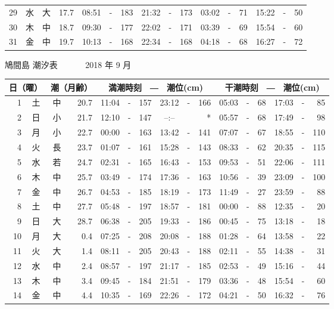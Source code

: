 \documentclass[12pt.a4j]{jsarticle}
\begin{document}
\begin{center}
\begin{table}[ht]
\begin{tabular}{|rc|cr|ccrccr|ccrccr|}
29 & 水 & 大 & 17.7 & 08:51 &-& 183 & 21:32 &-& 173 & 03:02 &-&  71 & 15:22 &-&  50 \\
30 & 木 & 中 & 18.7 & 09:30 &-& 177 & 22:02 &-& 171 & 03:39 &-&  69 & 15:54 &-&  60 \\
31 & 金 & 中 & 19.7 & 10:13 &-& 168 & 22:34 &-& 168 & 04:18 &-&  68 & 16:27 &-&  72 \\
\hline
\end{tabular}
\end{table}
\newpage
{\LARGE 鳩間島  潮汐表　　　}
{\large 2018 年  9 月}\\
\begin{table}[ht]
\begin{tabular}{|rc|cr|ccrccr|ccrccr|}
\hline
\multicolumn{2}{|c|}{日（曜）} & \multicolumn{2}{c|}{潮（月齢）} & \multicolumn{6}{c|}{満潮時刻　―　潮位(cm)} & \multicolumn{6}{c|}{干潮時刻　―　潮位(cm)} \\
\hline
 1 & 土 & 中 & 20.7 & 11:04 &-& 157 & 23:12 &-& 166 & 05:03 &-&  68 & 17:03 &-&  85 \\
 2 & 日 & 小 & 21.7 & 12:10 &-& 147 & --:-- & &  *  & 05:57 &-&  68 & 17:49 &-&  98 \\
 3 & 月 & 小 & 22.7 & 00:00 &-& 163 & 13:42 &-& 141 & 07:07 &-&  67 & 18:55 &-& 110 \\
 4 & 火 & 長 & 23.7 & 01:07 &-& 161 & 15:28 &-& 143 & 08:33 &-&  62 & 20:35 &-& 115 \\
 5 & 水 & 若 & 24.7 & 02:31 &-& 165 & 16:43 &-& 153 & 09:53 &-&  51 & 22:06 &-& 111 \\
 6 & 木 & 中 & 25.7 & 03:49 &-& 174 & 17:36 &-& 163 & 10:56 &-&  39 & 23:09 &-& 100 \\
 7 & 金 & 中 & 26.7 & 04:53 &-& 185 & 18:19 &-& 173 & 11:49 &-&  27 & 23:59 &-&  88 \\
 8 & 土 & 中 & 27.7 & 05:48 &-& 197 & 18:57 &-& 181 & 00:00 &-&  88 & 12:35 &-&  20 \\
 9 & 日 & 大 & 28.7 & 06:38 &-& 205 & 19:33 &-& 186 & 00:45 &-&  75 & 13:18 &-&  18 \\
10 & 月 & 大 &  0.4 & 07:25 &-& 208 & 20:08 &-& 188 & 01:28 &-&  64 & 13:58 &-&  22 \\
11 & 火 & 大 &  1.4 & 08:11 &-& 205 & 20:43 &-& 188 & 02:11 &-&  55 & 14:38 &-&  31 \\
12 & 水 & 中 &  2.4 & 08:57 &-& 197 & 21:17 &-& 185 & 02:53 &-&  49 & 15:16 &-&  44 \\
13 & 木 & 中 &  3.4 & 09:45 &-& 184 & 21:51 &-& 179 & 03:36 &-&  48 & 15:54 &-&  60 \\
14 & 金 & 中 &  4.4 & 10:35 &-& 169 & 22:26 &-& 172 & 04:21 &-&  50 & 16:32 &-&  76 \\

\end{tabular}
\end{table}
\end{center}
\end{document}
